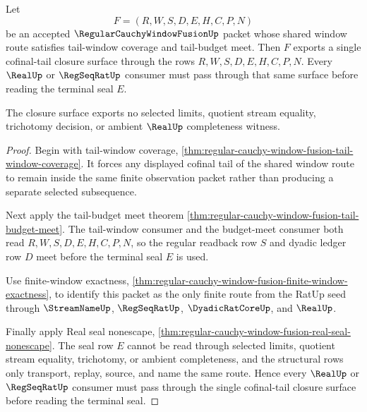 \begin{theorem}
\label{thm:regular-cauchy-window-fusion-cofinal-tail-closure}
Let
$$
F=(R,W,S,D,E,H,C,P,N)
$$
be an accepted $\RegularCauchyWindowFusionUp$ packet whose shared window route satisfies tail-window coverage and tail-budget meet. Then $F$ exports a single cofinal-tail closure surface through the rows $R,W,S,D,E,H,C,P,N$. Every $\RealUp$ or $\RegSeqRatUp$ consumer must pass through that same surface before reading the terminal seal $E$.

The closure surface exports no selected limits, quotient stream equality, trichotomy decision, or ambient $\RealUp$ completeness witness.
\end{theorem}
\begin{proof}
Begin with tail-window coverage, \autoref{thm:regular-cauchy-window-fusion-tail-window-coverage}. It forces any displayed cofinal tail of the shared window route to remain inside the same finite observation packet rather than producing a separate selected subsequence.

Next apply the tail-budget meet theorem \autoref{thm:regular-cauchy-window-fusion-tail-budget-meet}. The tail-window consumer and the budget-meet consumer both read $R,W,S,D,E,H,C,P,N$, so the regular readback row $S$ and dyadic ledger row $D$ meet before the terminal seal $E$ is used.

Use finite-window exactness, \autoref{thm:regular-cauchy-window-fusion-finite-window-exactness}, to identify this packet as the only finite route from the RatUp seed through $\StreamNameUp$, $\RegSeqRatUp$, $\DyadicRatCoreUp$, and $\RealUp$.

Finally apply Real seal nonescape, \autoref{thm:regular-cauchy-window-fusion-real-seal-nonescape}. The seal row $E$ cannot be read through selected limits, quotient stream equality, trichotomy, or ambient completeness, and the structural rows only transport, replay, source, and name the same route. Hence every $\RealUp$ or $\RegSeqRatUp$ consumer must pass through the single cofinal-tail closure surface before reading the terminal seal.
\end{proof}


